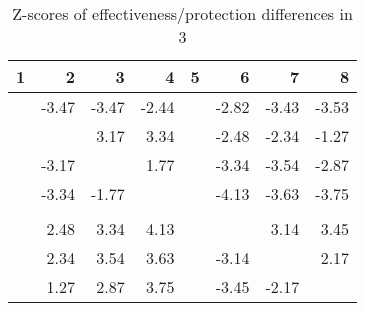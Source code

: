 \begin{table}[ht]
\centering
\begin{tabular}{rrrrrrrr}
  \hline
1 & 2 & 3 & 4 & 5 & 6 & 7 & 8 \\ 
  \hline
 & -3.47 & -3.47 & -2.44 &  & -2.82 & -3.43 & -3.53 \\ 
   &  & 3.17 & 3.34 &  & -2.48 & -2.34 & -1.27 \\ 
   & -3.17 &  & 1.77 &  & -3.34 & -3.54 & -2.87 \\ 
   & -3.34 & -1.77 &  &  & -4.13 & -3.63 & -3.75 \\ 
   &  &  &  &  &  &  &  \\ 
   & 2.48 & 3.34 & 4.13 &  &  & 3.14 & 3.45 \\ 
   & 2.34 & 3.54 & 3.63 &  & -3.14 &  & 2.17 \\ 
   & 1.27 & 2.87 & 3.75 &  & -3.45 & -2.17 &  \\ 
   \hline
\end{tabular}
\caption{Z-scores of effectiveness/protection differences in  3} 
\end{table}
